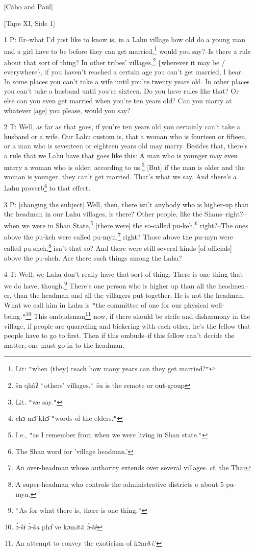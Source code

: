 
[Càbo and Paul]

[Tape XI, Side 1]

1 P: Er--what I'd just like to know is, in a Lahu village how old do a young man
and a girl have to be before they can get married,\footnote{Lit: \texttt{"}when (they) reach how many years can they get married?\texttt{"}} would you say?--Is there
a rule about that sort of thing? In other tribes' villages,\footnote{šu qhâʔ \texttt{"}others' villages.\texttt{"} šu is the remote or out-group} \{wherever it may
be / everywhere\}, if you haven't reached a certain age you can't get married,
I hear. In some places you can't take a wife until you're twenty years old. In
other places you can't take a husband until you're sixteen. Do you have rules like
that? Or else can you even get married when you're ten years old? Can you marry
at whatever [age] you please, would you say?

2 T: Well, as far as that goes, if you're ten years old you certainly can't take
a husband or a wife. Our Lahu custom is, that a woman who is fourteen or fifteen,
or a man who is seventeen or eighteen years old may marry. Besides that, there's
a rule that we Lahu have that goes like this: A man who is younger may even marry
a woman who is older, according to us.\footnote{Lit. \texttt{"}we say.\texttt{"}} [But] if the man is older and the woman
is younger, they can't get married. That's what we say. And there's a Lahu proverb\footnote{chɔ-mɔ̂ khɔ̂ \texttt{"}words of the elders.\texttt{"}}
to that effect.

3 P: [changing the subject] Well, then, there isn't anybody who is higher-up than
the headman in our Lahu villages, is there? Other people, like the Shans--right?--when
we were in Shan State,\footnote{I.e., \texttt{"}as I remember from when we were living in Shan state.\texttt{"}} [there were] the so-called pu-keh,\footnote{The Shan word for 'village headman.'} right?--The ones
above the pu-keh were called pu-myn,\footnote{An over-headman whose authority extends over several villages. cf. the Thai} right? Those above the pu-myn were called
pu-sheh,\footnote{A super-headman who controls the administrative districts o about 5 pu-myn.} isn't that so? And there were still several kinds [of officials] above
the pu-sheh. Are there such things among the Lahu?

4 T: Well, we Lahu don't really have that sort of thing. There is one thing that
we do have, though.\footnote{\texttt{"}As for what there is, there is one thing.\texttt{"}} There's one person who is higher up than all the headmen--er,
than the headman and all the villagers put together. He is not the headman. What
we call him in Lahu is \texttt{"}the committee of one for our physical well-being.\texttt{"}\footnote{ɔ̀-š\emph{ɨ} ɔ̀-š\emph{a} phɔ̂ ve k\emph{ɔ}m\emph{i}t\emph{i}: ɔ̀-š\emph{ɨ}}
This ombudsman\footnote{An attempt to convey the exoticism of k\emph{ɔ}m\emph{i}t\emph{i}.'} now, if there should be strife and disharmony in the village,
if people are quarreling and bickering with each other, he's the fellow that people
have to go to first. Then if this ombuds--if this fellow can't decide the matter,
one must go in to the headman.

